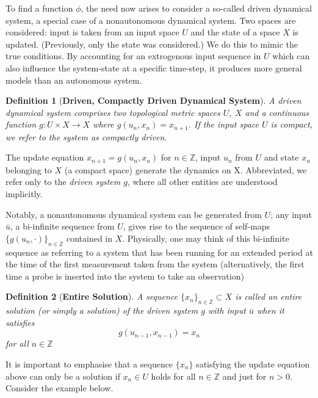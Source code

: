 \documentclass[a4paper,12pt,twoside]{report}
\newtheorem{Definition}{Definition}[]
\begin{document}
To find a function $\phi$, the need now arises to consider a so-called driven dynamical system, a special case of a nonautonomous dynamical system. Two spaces are considered: input is taken from an input space $U$ and the state of a space $X$ is updated. (Previously, only the state was considered.)
We do this to mimic the true conditions. By accounting for an extrogenous input sequence in $U$ which can also influence the  system-state at a specific time-step, it produces more general models than an autonomous system.

\begin{Definition}
  [\bf Driven, Compactly Driven Dynamical System] \label{Dfn_DDS} \rm
A driven dynamical system comprises two topological metric spaces $U$, $X$ and a continuous function  $g:U\times{X}\to{X}$ where $g(u_n, x_n)=x_{n+1}$.
If the input space $U$ is compact, we refer to the system as compactly driven. 
\end{Definition}

The update equation $x_{n+1} = g(u_n,x_n)$ for $n \in\mathbb{Z}$, input $u_n$ from $U$ and state $x_n$ belonging to $X$ (a compact space) generate the dynamics on X. 
Abbreviated, we refer only to the \textit{driven system $g$}, where all other entities are understood implicitly.

Notably, a nonautonomous dynamical system can be generated from $U$; any input $\overline{u}$, a bi-infinite sequence from $U$, gives rise to the sequence of self-maps $\{g(u_n, \cdot)\}_{n\in\mathbb{Z}}$ contained in $X$.
Physically, one may think of this bi-infinite sequence as referring to a system that has been running for an extended period at the time of the first measurement taken from the system (alternatively, the first time a probe is inserted into the system to take an observation)

\begin{Definition}
  [\bf Entire Solution] \label{Dfn_Soln} \rm
  A sequence $\{x_n\}_{n\in\mathbb{Z}}\subset X$ is called an entire solution (or simply a solution) of the driven system  $g$ with input $\overline{u}$ when it satisfies 
  \[g(u_{n-1}, x_{n-1})=x_n\] for all $n\in\mathbb{Z}$
\end{Definition}

It is important to emphasise that a sequence $\{x_n\}$ satisfying the update equation above can only be a solution if $x_n\in{U}$ holds for all $n\in\mathbb{Z}$ and just for $n>0$. Consider the example below.
\end{document}
